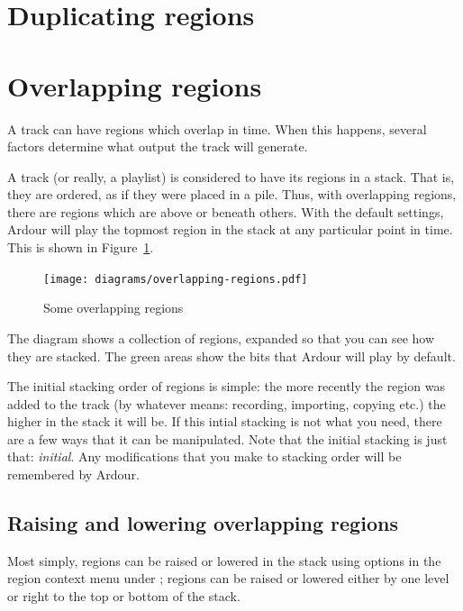 \documentclass[10pt,a4paper]{book}
\newcommand{\menu}[1]{\emph{\StrSubstitute{#1}{,}{ $\rightarrow$ }}}
\begin{document}
{\section{Duplicating regions}



\section{Overlapping regions}
\label{sec:overlapping-regions}

A track can have regions which overlap in time.  When this happens,
several factors determine what output the track will generate.

A track (or really, a playlist) is considered to have its regions in a
stack.  That is, they are ordered, as if they were placed in a pile.
Thus, with overlapping regions, there are regions which are above or
beneath others.  With the default settings, Ardour will play the
topmost region in the stack at any particular point in time.  This is
shown in Figure~\ref{fig:overlapping-regions}.

\begin{figure}[ht]
\begin{center}
\texttt{[image: diagrams/overlapping-regions.pdf]}
\end{center}
\caption{Some overlapping regions}
\label{fig:overlapping-regions}
\end{figure}

The diagram shows a collection of regions, expanded so that you can
see how they are stacked.  The green areas show the bits that Ardour
will play by default.

The initial stacking order of regions is simple: the more recently the
region was added to the track (by whatever means: recording,
importing, copying etc.) the higher in the stack it will be.  If this
intial stacking is not what you need, there are a few ways that it can
be manipulated.  Note that the initial stacking is just that:
\emph{initial}.  Any modifications that you make to stacking order
will be remembered by Ardour.



\subsection{Raising and lowering overlapping regions}

Most simply, regions can be raised or lowered in the stack using
options in the region context menu under \menu{Layering}; regions can
be raised or lowered either by one level or right to the top or bottom
of the stack.

}
\end{document}
